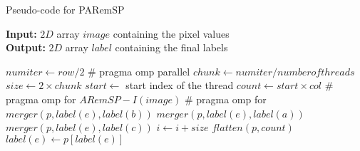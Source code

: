 \begin{algorithm}[ht]
\small
{
	\caption{Pseudo-code for PARemSP}
	\label{alg:PARemSP}
	\textbf{Input:} $2D$ array $image$ containing the pixel values \\
	\textbf{Output:} $2D$ array $label$ containing the final labels
	\begin{algorithmic}[1]
		\State $num iter \gets row/2 $ 
		\State \# pragma omp parallel
			\State $chunk \gets numiter/number of threads $ 
			\State $size \gets 2 \times chunk$
			\State $start \gets $ start index of the thread
			\State $count \gets start \times col$
			\State \# pragma omp for
				\State $ARemSP-I(image)$
			\State \# pragma omp for
					  			\State $merger(p,label(e),label(b))$
					  		\Else
									\State $merger(p,label(e),label(a))$
								\EndIf
									\State $merger(p,label(e),label(c))$
								\EndIf
							\EndIf
						\EndIf
					\EndFor
					\State $i \gets i + size$
				\EndFor		
		\State $flatten(p,count)$ 
				\State $label(e) \gets p[label(e)]$
			\EndFor
		\EndFor		
	\EndFunction
	\end{algorithmic}	
}
\end{algorithm}

